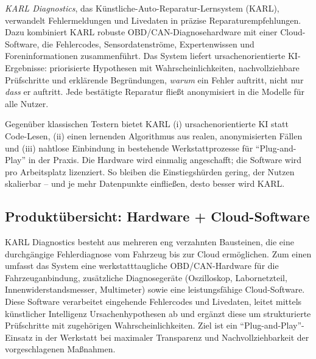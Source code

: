 \emph{KARL Diagnostics}, das Künstliche-Auto-Reparatur-Lernsystem (KARL), verwandelt Fehlermeldungen und Livedaten in präzise Reparaturempfehlungen. Dazu kombiniert KARL robuste OBD/CAN-Diagnosehardware mit einer Cloud-Software, die Fehlercodes, Sensordatenströme, Expertenwissen und Foreninformationen zusammenführt. Das System liefert ursachenorientierte KI-Ergebnisse: priorisierte Hypothesen mit Wahrscheinlichkeiten, nachvollziehbare Prüfschritte und erklärende Begründungen, \emph{warum} ein Fehler auftritt, nicht nur \emph{dass} er auftritt. Jede bestätigte Reparatur fließt anonymisiert in die Modelle für alle Nutzer. 

Gegenüber klassischen Testern bietet KARL (i) ursachenorientierte \ac{KI} statt Code-Lesen, (ii) einen lernenden Algorithmus aus realen, anonymisierten Fällen und (iii) nahtlose Einbindung in bestehende Werkstattprozesse für \enquote{Plug-and-Play} in der Praxis. Die Hardware wird einmalig angeschafft; die Software wird pro Arbeitsplatz lizenziert. So bleiben die Einstiegshürden gering, der Nutzen skalierbar – und je mehr Datenpunkte einfließen, desto besser wird KARL.

\subsection{Produktübersicht: Hardware + Cloud-Software}
\ac{KARL} Diagnostics besteht aus mehreren eng verzahnten Bausteinen, die eine durchgängige Fehlerdiagnose vom Fahrzeug bis zur Cloud ermöglichen. Zum einen umfasst das System eine werkstatttaugliche OBD/CAN-Hardware für die Fahrzeuganbindung, zusätzliche Diagnosegeräte (Oszilloskop, Labornetzteil, Innenwiderstandsmesser, Multimeter) sowie eine leistungsfähige Cloud-Software. Diese Software verarbeitet eingehende Fehlercodes und Livedaten, leitet mittels künstlicher Intelligenz Ursachenhypothesen ab und ergänzt diese um strukturierte Prüfschritte mit zugehörigen Wahrscheinlichkeiten. Ziel ist ein \enquote{Plug-and-Play}-Einsatz in der Werkstatt bei maximaler Transparenz und Nachvollziehbarkeit der vorgeschlagenen Maßnahmen.


